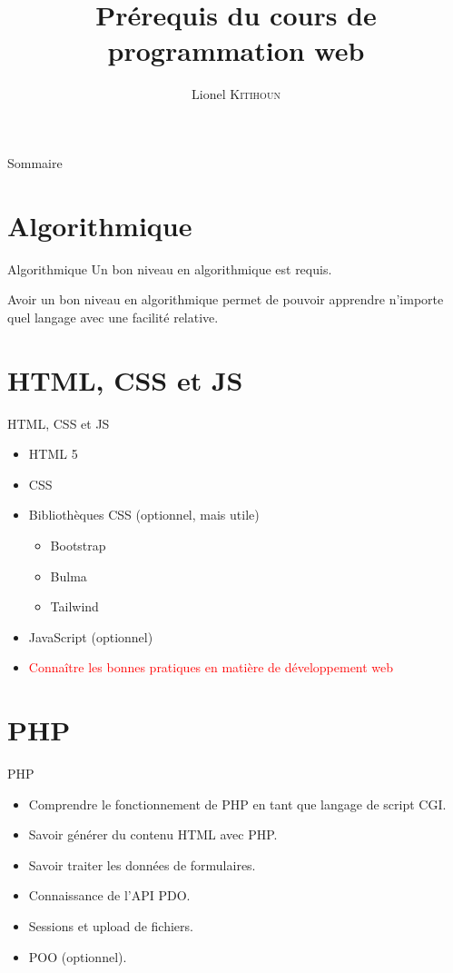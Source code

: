 \documentclass{beamer}
\title{Prérequis du cours de programmation web}
\date{}
\author{Lionel \textsc{Kitihoun}}
\begin{document}
\begin{frame}[plain]
\maketitle
\end{frame}

\begin{frame}{Sommaire}
\tableofcontents
\end{frame}

\section{Algorithmique}

\begin{frame}{Algorithmique}
Un bon niveau en algorithmique est requis.

Avoir un bon niveau en algorithmique permet de pouvoir apprendre n'importe quel langage avec une facilité relative.
\end{frame}

\section{HTML, CSS et JS}
\begin{frame}{HTML, CSS et JS}
\begin{itemize}
  \item HTML 5
  \item CSS
  \item Bibliothèques CSS (optionnel, mais utile)
  \begin{itemize}
    \item Bootstrap
    \item Bulma
    \item Tailwind
  \end{itemize}
  \item JavaScript (optionnel)
  \item \textcolor{red}{Connaître les bonnes pratiques en matière de développement web}
\end{itemize}
\end{frame}

\section{PHP}
\begin{frame}{PHP}
\begin{center}
  \begin{itemize}
    \item Comprendre le fonctionnement de PHP en tant que langage de script CGI.
    \item Savoir générer du contenu HTML avec PHP.
    \item Savoir traiter les données de formulaires.
    \item Connaissance de l'API PDO.
    \item Sessions et upload de fichiers.
    \item POO (optionnel).
  \end{itemize}
\end{center}
\end{frame}
\end{document}
